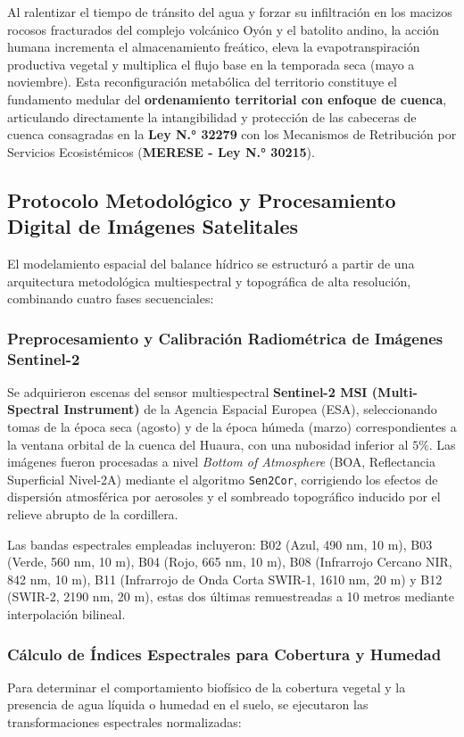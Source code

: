 \documentclass[11pt,a4paper]{article}
\begin{document}
Al ralentizar el tiempo de tránsito del agua y forzar su infiltración en los macizos rocosos fracturados del complejo volcánico Oyón y el batolito andino, la acción humana incrementa el almacenamiento freático, eleva la evapotranspiración productiva vegetal y multiplica el flujo base en la temporada seca (mayo a noviembre). Esta reconfiguración metabólica del territorio constituye el fundamento medular del \textbf{ordenamiento territorial con enfoque de cuenca}, articulando directamente la intangibilidad y protección de las cabeceras de cuenca consagradas en la \textbf{Ley N.° 32279} con los Mecanismos de Retribución por Servicios Ecosistémicos (\textbf{MERESE - Ley N.° 30215}).

\subsection{Protocolo Metodológico y Procesamiento Digital de Imágenes Satelitales}
El modelamiento espacial del balance hídrico se estructuró a partir de una arquitectura metodológica multiespectral y topográfica de alta resolución, combinando cuatro fases secuenciales:

\subsubsection{Preprocesamiento y Calibración Radiométrica de Imágenes Sentinel-2}
Se adquirieron escenas del sensor multiespectral \textbf{Sentinel-2 MSI (Multi-Spectral Instrument)} de la Agencia Espacial Europea (ESA), seleccionando tomas de la época seca (agosto) y de la época húmeda (marzo) correspondientes a la ventana orbital de la cuenca del Huaura, con una nubosidad inferior al $5\%$. Las imágenes fueron procesadas a nivel \textit{Bottom of Atmosphere} (BOA, Reflectancia Superficial Nivel-2A) mediante el algoritmo \texttt{Sen2Cor}, corrigiendo los efectos de dispersión atmosférica por aerosoles y el sombreado topográfico inducido por el relieve abrupto de la cordillera.

Las bandas espectrales empleadas incluyeron: B02 (Azul, 490 nm, 10 m), B03 (Verde, 560 nm, 10 m), B04 (Rojo, 665 nm, 10 m), B08 (Infrarrojo Cercano NIR, 842 nm, 10 m), B11 (Infrarrojo de Onda Corta SWIR-1, 1610 nm, 20 m) y B12 (SWIR-2, 2190 nm, 20 m), estas dos últimas remuestreadas a 10 metros mediante interpolación bilineal.

\subsubsection{Cálculo de Índices Espectrales para Cobertura y Humedad}
Para determinar el comportamiento biofísico de la cobertura vegetal y la presencia de agua líquida o humedad en el suelo, se ejecutaron las transformaciones espectrales normalizadas:
\end{document}
